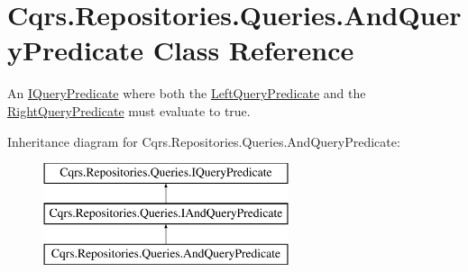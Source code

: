\hypertarget{classCqrs_1_1Repositories_1_1Queries_1_1AndQueryPredicate}{}\section{Cqrs.\+Repositories.\+Queries.\+And\+Query\+Predicate Class Reference}
\label{classCqrs_1_1Repositories_1_1Queries_1_1AndQueryPredicate}


An \hyperlink{interfaceCqrs_1_1Repositories_1_1Queries_1_1IQueryPredicate}{I\+Query\+Predicate} where both the \hyperlink{classCqrs_1_1Repositories_1_1Queries_1_1AndQueryPredicate_ae083f7e251a564554bdb00b111226f18_ae083f7e251a564554bdb00b111226f18}{Left\+Query\+Predicate} and the \hyperlink{classCqrs_1_1Repositories_1_1Queries_1_1AndQueryPredicate_aa55816927e363ba4e7e313ad30ac2c2e_aa55816927e363ba4e7e313ad30ac2c2e}{Right\+Query\+Predicate} must evaluate to true.  


Inheritance diagram for Cqrs.\+Repositories.\+Queries.\+And\+Query\+Predicate\+:\begin{figure}[H]
\begin{center}
\leavevmode
\includegraphics[height=3.000000cm]{classCqrs_1_1Repositories_1_1Queries_1_1AndQueryPredicate}
\end{center}
\end{figure}
